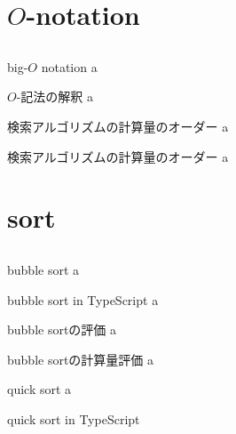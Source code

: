 \documentclass{beamer}
\begin{document}
\section{$O$-notation}		%
\subsection{}

\begin{frame}[fragile]{big-$O$ notation}{}
a
\end{frame}

\begin{frame}[fragile]{$O$-記法の解釈}{}
a
\end{frame}

\begin{frame}[fragile]{検索アルゴリズムの計算量のオーダー}{}
a
\end{frame}

\begin{frame}[fragile]{検索アルゴリズムの計算量のオーダー}{}
a
\end{frame}

\section{sort}		%
\subsection{}

\begin{frame}[fragile]{bubble sort}{}
a
\end{frame}


\begin{frame}[fragile]{bubble sort in TypeScript}{}
a
\end{frame}

\begin{frame}[fragile]{bubble sortの評価}{}
a
\end{frame}


\begin{frame}[fragile]{bubble sortの計算量評価}{}
a
\end{frame}


\begin{frame}[fragile]{quick sort}{}
a
\end{frame}

\begin{frame}[fragile]{quick sort in TypeScript}{}
\end{frame}
\end{document}
